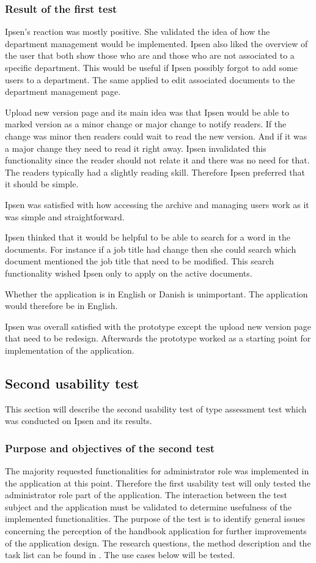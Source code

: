 \subsubsection*{Result of the first test}
Ipsen's reaction was mostly positive. 
She validated the idea of how the department management would be implemented. 
Ipsen also liked the overview of the user that both show those who are and those who are not associated to a specific department.
This would be useful if Ipsen possibly forgot to add some users to a department. 
The same applied to edit associated documents to the department management page. 

Upload new version page and its main idea was that Ipsen would be able to marked version as a minor change or major change to notify readers. 
If the change was minor then readers could wait to read the new version.
And if it was a major change they need to read it right away. 
Ipsen invalidated this functionality since the reader should not relate it and there was no need for that. 
The readers typically had a slightly reading skill. 
Therefore Ipsen preferred that it should be simple. 

Ipsen was satisfied with how accessing the archive and managing users work as it was simple and straightforward. 

Ipsen thinked that it would be helpful to be able to search for a word in the documents.
For instance if a job title had change then she could search which document mentioned the job title that need to be modified.
This search functionality wished Ipsen only to apply on the active documents. 

Whether the application is in English or Danish is unimportant. 
The application would therefore be in English. 

Ipsen was overall satisfied with the prototype except the upload new version page that need to be redesign. 
Afterwards the prototype worked as a starting point for implementation of the application. 

\subsection{Second usability test}\label{secondtest}
This section will describe the second usability test	of type assessment test which was conducted on Ipsen and its results.

\subsubsection*{Purpose and objectives of the second test}
The majority requested functionalities for administrator role was implemented in the application at this point. 
Therefore the first usability test will only tested the administrator role part of the application.
The interaction between the test subject and the application must be validated to determine usefulness of the implemented functionalities. 
The purpose of the test is to identify general issues concerning the perception of the handbook application for further improvements of the application design.
The research questions, the method description and the task list can be found in .
The use cases below will be tested.

